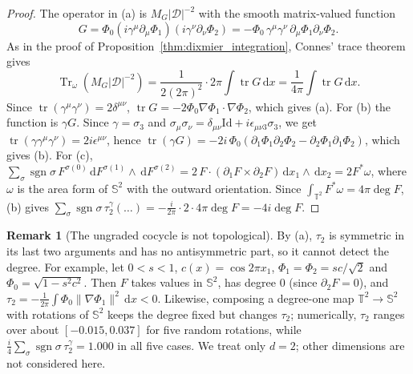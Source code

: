 \documentclass[11pt,a4paper,reqno]{amsart}
\theoremstyle{definition}
\newtheorem{remark}[theorem]{Remark}
\numberwithin{equation}{section}
\newcommand{\Id}{\mathrm{Id}}
\newcommand{\Tr}{\operatorname{Tr}}
\newcommand{\dif}{\,\mathrm{d}}
\begin{document}
\begin{proof}
The operator in (a) is $M_G|\mathcal{D}|^{-2}$ with the smooth matrix-valued function
\begin{equation}
    G = \Phi_0 (i\gamma^\mu\partial_\mu\Phi_1)(i\gamma^\nu\partial_\nu\Phi_2) = -\Phi_0\, \gamma^\mu\gamma^\nu\, \partial_\mu\Phi_1 \partial_\nu\Phi_2.
\end{equation}
As in the proof of Proposition~\ref{thm:dixmier_integration}, Connes' trace theorem gives
\begin{equation}
    \Tr_\omega(M_G|\mathcal{D}|^{-2}) = \frac{1}{2(2\pi)^2} \cdot 2\pi \int \operatorname{tr} G \dif x = \frac{1}{4\pi}\int \operatorname{tr}G \dif x.
\end{equation} Since $\operatorname{tr}(\gamma^\mu\gamma^\nu) = 2\delta^{\mu\nu}$, $\operatorname{tr} G = -2\Phi_0 \nabla\Phi_1\cdot\nabla\Phi_2$, which gives (a). For (b) the function is $\gamma G$. Since $\gamma = \sigma_3$ and $\sigma_\mu\sigma_\nu = \delta_{\mu\nu}\Id + i\epsilon_{\mu\nu 3}\sigma_3$, we get $\operatorname{tr}(\gamma\gamma^\mu\gamma^\nu) = 2i\epsilon^{\mu\nu}$, hence $\operatorname{tr}(\gamma G) = -2i\,\Phi_0(\partial_1\Phi_1\partial_2\Phi_2 - \partial_2\Phi_1\partial_1\Phi_2)$, which gives (b). For (c), $\sum_\sigma \operatorname{sgn}\sigma\, F^{\sigma(0)} \dif F^{\sigma(1)} \wedge \dif F^{\sigma(2)} = 2\, F\cdot(\partial_1 F \times \partial_2 F) \dif x_1\wedge\dif x_2 = 2F^*\omega$, where $\omega$ is the area form of $\mathbb{S}^2$ with the outward orientation. Since $\int_{\mathbb{T}^2} F^*\omega = 4\pi\deg F$, (b) gives $\sum_\sigma \operatorname{sgn}\sigma\, \tau_2^\gamma(\dots) = -\frac{i}{2\pi}\cdot 2\cdot 4\pi\deg F = -4i\deg F$.
\end{proof}

\begin{remark}[The ungraded cocycle is not topological]
\label{rem:tau_not_topological}
By (a), $\tau_2$ is symmetric in its last two arguments and has no antisymmetric part, so it cannot detect the degree. For example, let $0 < s < 1$, $c(x) = \cos 2\pi x_1$, $\Phi_1 = \Phi_2 = s c/\sqrt{2}$ and $\Phi_0 = \sqrt{1 - s^2c^2}$. Then $F$ takes values in $\mathbb{S}^2$, has degree $0$ (since $\partial_2 F = 0$), and $\tau_2 = -\frac{1}{2\pi}\int\Phi_0\|\nabla\Phi_1\|^2 \dif x < 0$. Likewise, composing a degree-one map $\mathbb{T}^2 \to \mathbb{S}^2$ with rotations of $\mathbb{S}^2$ keeps the degree fixed but changes $\tau_2$; numerically, $\tau_2$ ranges over about $[-0.015, 0.037]$ for five random rotations, while $\frac{i}{4}\sum_\sigma\operatorname{sgn}\sigma\,\tau_2^\gamma = 1.000$ in all five cases. We treat only $d = 2$; other dimensions are not considered here.
\end{remark}
\end{document}
